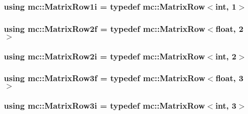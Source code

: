 \subsubsection[{\texorpdfstring{Matrix\+Row1i}{MatrixRow1i}}]{\setlength{\rightskip}{0pt plus 5cm}using {\bf mc\+::\+Matrix\+Row1i} = typedef {\bf mc\+::\+Matrix\+Row}$<$int, 1$>$}\hypertarget{namespacemc_a93694e95604472a1c26070b1b70990cb}{}\label{namespacemc_a93694e95604472a1c26070b1b70990cb}
\subsubsection[{\texorpdfstring{Matrix\+Row2f}{MatrixRow2f}}]{\setlength{\rightskip}{0pt plus 5cm}using {\bf mc\+::\+Matrix\+Row2f} = typedef {\bf mc\+::\+Matrix\+Row}$<$float, 2$>$}\hypertarget{namespacemc_a3b4a3205e212db1db4bc8e47fe4cc312}{}\label{namespacemc_a3b4a3205e212db1db4bc8e47fe4cc312}
\subsubsection[{\texorpdfstring{Matrix\+Row2i}{MatrixRow2i}}]{\setlength{\rightskip}{0pt plus 5cm}using {\bf mc\+::\+Matrix\+Row2i} = typedef {\bf mc\+::\+Matrix\+Row}$<$int, 2$>$}\hypertarget{namespacemc_a668aec14caead769bdd4d7066e8e15fe}{}\label{namespacemc_a668aec14caead769bdd4d7066e8e15fe}
\subsubsection[{\texorpdfstring{Matrix\+Row3f}{MatrixRow3f}}]{\setlength{\rightskip}{0pt plus 5cm}using {\bf mc\+::\+Matrix\+Row3f} = typedef {\bf mc\+::\+Matrix\+Row}$<$float, 3$>$}\hypertarget{namespacemc_a8b0d875a0b758d1b6ca600bfca37f1b9}{}\label{namespacemc_a8b0d875a0b758d1b6ca600bfca37f1b9}
\subsubsection[{\texorpdfstring{Matrix\+Row3i}{MatrixRow3i}}]{\setlength{\rightskip}{0pt plus 5cm}using {\bf mc\+::\+Matrix\+Row3i} = typedef {\bf mc\+::\+Matrix\+Row}$<$int, 3$>$}\hypertarget{namespacemc_a3ed70e2494e81425a982a4d7abedb1b8}{}\label{namespacemc_a3ed70e2494e81425a982a4d7abedb1b8}
